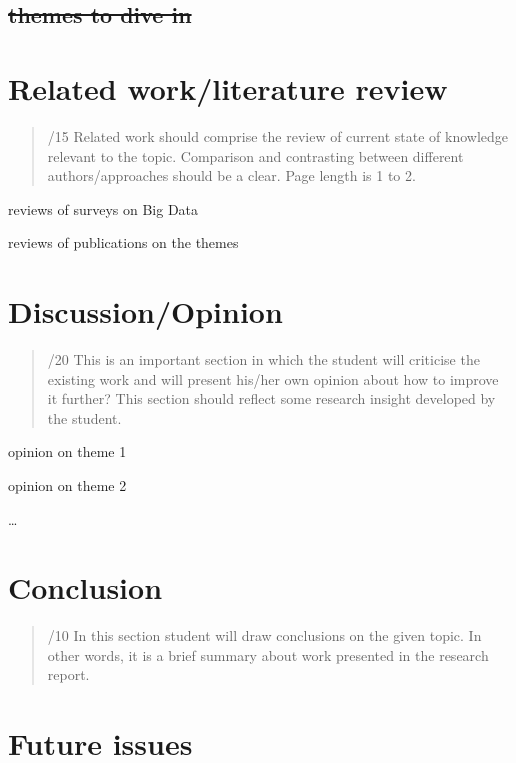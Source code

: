 \documentclass[conference]{IEEEtran}
\begin{document}
\hypertarget{themes-to-dive-in}{%
\subsection{\texorpdfstring{\sout{themes to dive
in}}{themes to dive in}}\label{themes-to-dive-in}}

\hypertarget{related-workliterature-review}{%
\section{Related work/literature
review}\label{related-workliterature-review}}

\begin{quote}
/15 Related work should comprise the review of current state of
knowledge relevant to the topic. Comparison and contrasting between
different authors/approaches should be a clear. Page length is 1 to 2.
\end{quote}

reviews of surveys on Big Data

reviews of publications on the themes

\hypertarget{discussionopinion}{%
\section{Discussion/Opinion}\label{discussionopinion}}

\begin{quote}
/20 This is an important section in which the student will criticise the
existing work and will present his/her own opinion about how to improve
it further? This section should reflect some research insight developed
by the student.
\end{quote}

opinion on theme 1

opinion on theme 2

\ldots{}

\hypertarget{conclusion}{%
\section{Conclusion}\label{conclusion}}

\begin{quote}
/10 In this section student will draw conclusions on the given topic. In
other words, it is a brief summary about work presented in the research
report.
\end{quote}

\hypertarget{future-issues}{%
\section{Future issues}\label{future-issues}}
\end{document}
